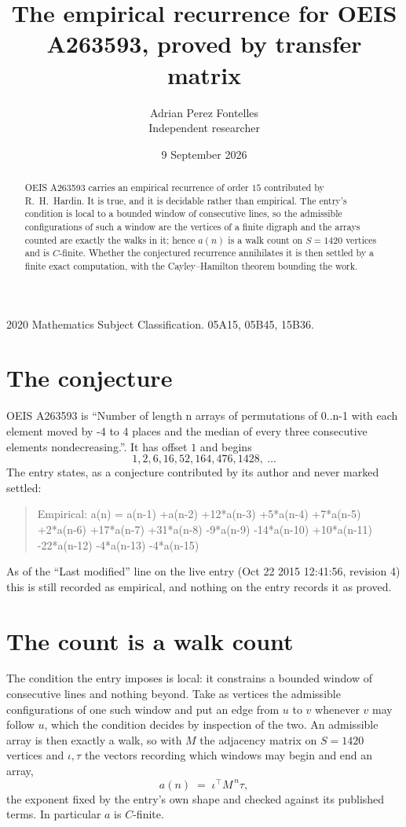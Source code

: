 \documentclass[11pt,a4paper]{article}
\title{The empirical recurrence for OEIS A263593, proved by transfer matrix}
\author{Adrian Perez Fontelles\\ \small Independent researcher}
\date{9 September 2026}
\theoremstyle{plain}
\theoremstyle{definition}
\begin{document}
\maketitle

\begin{abstract}
OEIS A263593 carries an empirical recurrence of order $15$ contributed by R.~H.~Hardin. It is
true, and it is decidable rather than empirical. The entry's condition is local to a bounded window of consecutive lines, so
the admissible configurations of such a window are the vertices of a finite digraph and the
arrays counted are exactly the walks in it; hence $a(n)$ is a walk count on $S=1420$ vertices
and is $C$-finite. Whether the conjectured recurrence annihilates it is then settled by a
finite exact computation, with the Cayley--Hamilton theorem bounding the work.
\end{abstract}

\noindent\small 2020 Mathematics Subject Classification. 05A15, 05B45, 15B36.\normalsize

\section{The conjecture}

OEIS A263593 is ``Number of length n arrays of permutations of 0..n-1 with each element moved by -4 to 4 places and the median of every three consecutive elements nondecreasing.''. It has offset $1$ and begins
\[
1, 2, 6, 16, 52, 164, 476, 1428,\ \dots
\]
The entry states, as a conjecture contributed by its author and never marked settled:
\begin{quote}
Empirical: a(n) = a(n-1) +a(n-2) +12*a(n-3) +5*a(n-4) +7*a(n-5) +2*a(n-6) +17*a(n-7) +31*a(n-8) -9*a(n-9) -14*a(n-10) +10*a(n-11) -22*a(n-12) -4*a(n-13) -4*a(n-15)
\end{quote}
As of the ``Last modified'' line on the live entry (Oct 22 2015 12:41:56, revision 4) this is still
recorded as empirical, and nothing on the entry records it as proved.

\section{The count is a walk count}

The condition the entry imposes is local: it constrains a bounded window of consecutive lines and nothing beyond. Take as
vertices the admissible configurations of one such window and put an edge from $u$ to $v$
whenever $v$ may follow $u$, which the condition decides by inspection of the two. An
admissible array is then exactly a walk, so with $M$ the adjacency matrix on $S=1420$ vertices
and $\iota,\tau$ the vectors recording which windows may begin and end an array,
\[
a(n)\;=\;\iota^{\!\top}M^{\,n}\tau ,
\]
the exponent fixed by the entry's own shape and checked against its published terms. In
particular $a$ is $C$-finite.
\end{document}
